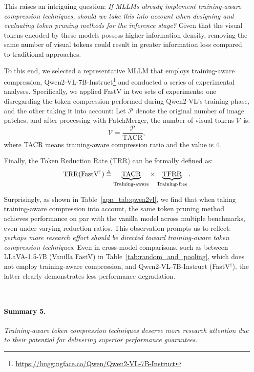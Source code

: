 This raises an intriguing question: \emph{If MLLMs already implement training-aware compression techniques, should we take this into account when designing and evaluating token pruning methods for the inference stage?} Given that the visual tokens encoded by these models possess higher information density, removing the same number of visual tokens could result in greater information loss compared to traditional approaches.

To this end, we selected a representative MLLM that employs training-aware compression, Qwen2-VL-7B-Instruct\footnote{\url{https://huggingface.co/Qwen/Qwen2-VL-7B-Instruct}} and conducted a series of experimental analyses. Specifically, we applied FastV in two sets of experiments: one disregarding the token compression performed during Qwen2-VL's training phase, and the other taking it into account:
Let $\mathcal{P}$ denote the original number of image patches, and after processing with PatchMerger, the number of visual tokens $\mathcal{V}$ is:
\begin{equation}
    \mathcal{V} = \frac{\mathcal{P}}{\text{TACR}},
\end{equation}
where TACR means training-aware compression ratio and the value is 4. 

Finally, the Token Reduction Rate (TRR) can be formally defined as:
\begin{equation}
    \text{TRR}(\text{FastV}^\dagger) \triangleq 
    \underbrace{\text{TACR}}_{\text{Training-aware}} \times 
    \underbrace{\text{TFRR}}_{\text{Training-free}}.
    \vspace{-1mm}
\end{equation}

Surprisingly, as shown in Table~\ref{app_tab:qwen2vl}, we find that when taking training-aware compression into account, the same token pruning method achieves performance on par with the vanilla model across multiple benchmarks, even under varying reduction ratios.
This observation prompts us to reflect: \emph{perhaps more research effort should be directed toward training-aware token compression techniques}. Even in cross-model comparisons, such as between LLaVA-1.5-7B (Vanilla FastV) in Table~\ref{tab:random_and_pooling}, which does not employ training-aware compression, and Qwen2-VL-7B-Instruct (FastV$^\dagger$), the latter clearly demonstrates less performance degradation. 
\vspace{-2mm}
\begin{takeaways}
\ \paragraph{Summary 5.} 
    \emph{Training-aware token compression techniques deserve more research attention due to their potential for delivering superior performance guarantees.}
\end{takeaways}

